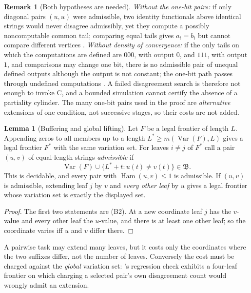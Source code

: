 \documentclass[11pt,letterpaper]{article}
\theoremstyle{definition}
\newtheorem{lemma}[definition]{Lemma}
\newtheorem{remark}[definition]{Remark}
\numberwithin{equation}{section}
\newcommand{\Var}{\operatorname{Var}}
\newcommand{\Ham}{\operatorname{Ham}}
\newcommand{\bud}{\mathfrak B}
\newcommand{\src}[1]{\leavevmode{\sffamily\footnotesize\color{Steel}[#1]}}
\newcommand{\rep}[1]{\leavevmode{\sffamily\small\color{Steel}R#1}}
\begin{document}
\begin{remark}[Both hypotheses are needed]\label{rem:trilemmasharp}
\emph{Without the one-bit pairs:} if only diagonal pairs $(u,u)$ were admissible, two identity functionals above identical strings would never disagree admissibly, yet they compute a possibly noncomputable common tail; comparing equal tails gives $a_i=b_i$ but cannot compare different vertices \src{R2, R6}. \emph{Without density of convergence:} if the only tails on which the computations are defined are $000$, with output $0$, and $111$, with output $1$, and comparisons may change one bit, there is no admissible pair of unequal defined outputs although the output is not constant; the one-bit path passes through undefined computations \src{R7}. A failed disagreement search is therefore not enough to invoke C, and a bounded simulation cannot certify the absence of a partiality cylinder. The many one-bit pairs used in the proof are \emph{alternative} extensions of one condition, not successive stages, so their costs are not added.
\end{remark}

\begin{lemma}[Buffering and global lifting]\label{lem:lift}\src{R2, R6, R7}
Let $F$ be a legal frontier of length $L$. Appending zeros to all members up to a length $L^*\ge m(\Var(F),L)$ gives a legal frontier $F^*$ with the same variation set. For leaves $i\ne j$ of $F^*$ call a pair $(u,v)$ of equal-length strings \emph{admissible} if
\[
 \Var(F)\cup\{L^*+t:u(t)\ne v(t)\}\in\bud .
\]
This is decidable, and every pair with $\Ham(u,v)\le1$ is admissible. If $(u,v)$ is admissible, extending leaf $j$ by $v$ and \emph{every other leaf} by $u$ gives a legal frontier whose variation set is exactly the displayed set.
\end{lemma}
\begin{proof}
The first two statements are (B2). At a new coordinate leaf $j$ has the $v$-value and every other leaf the $u$-value, and there is at least one other leaf; so the coordinate varies iff $u$ and $v$ differ there.
\end{proof}
A pairwise task may extend many leaves, but it costs only the coordinates where the two suffixes differ, not the number of leaves. Conversely the cost must be charged against the \emph{global} variation set: \rep6's regression check exhibits a four-leaf frontier on which charging a selected pair's own disagreement count would wrongly admit an extension.
\end{document}
